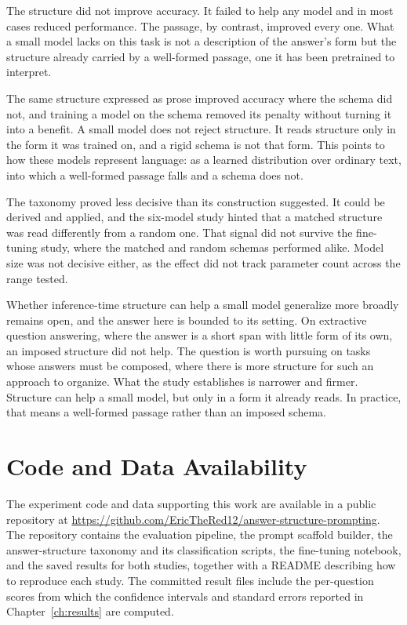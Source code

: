 \documentclass[master]{thesis}
\newcommand{\cref}[1]{Chapter~\ref{#1}}  %
\begin{document}
The structure did not improve accuracy. It failed to help any model and in most cases reduced performance. The passage, by contrast, improved every one. What a small model lacks on this task is not a description of the answer's form but the structure already carried by a well-formed passage, one it has been pretrained to interpret.

The same structure expressed as prose improved accuracy where the schema did not, and training a model on the schema removed its penalty without turning it into a benefit. A small model does not reject structure. It reads structure only in the form it was trained on, and a rigid schema is not that form. This points to how these models represent language: as a learned distribution over ordinary text, into which a well-formed passage falls and a schema does not.

The taxonomy proved less decisive than its construction suggested. It could be derived and applied, and the six-model study hinted that a matched structure was read differently from a random one. That signal did not survive the fine-tuning study, where the matched and random schemas performed alike. Model size was not decisive either, as the effect did not track parameter count across the range tested.

Whether inference-time structure can help a small model generalize more broadly remains open, and the answer here is bounded to its setting. On extractive question answering, where the answer is a short span with little form of its own, an imposed structure did not help. The question is worth pursuing on tasks whose answers must be composed, where there is more structure for such an approach to organize. What the study establishes is narrower and firmer. Structure can help a small model, but only in a form it already reads. In practice, that means a well-formed passage rather than an imposed schema.


\backmatter




\appendix

\chapter{Code and Data Availability}
\label{app:code}

The experiment code and data supporting this work are available in a public repository at \url{https://github.com/EricTheRed12/answer-structure-prompting}. The repository contains the evaluation pipeline, the prompt scaffold builder, the answer-structure taxonomy and its classification scripts, the fine-tuning notebook, and the saved results for both studies, together with a README describing how to reproduce each study. The committed result files include the per-question scores from which the confidence intervals and standard errors reported in \cref{ch:results} are computed.
\end{document}
